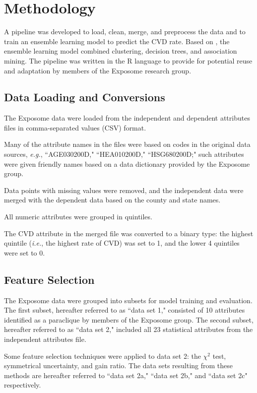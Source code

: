 \documentclass[conference,compsoc]{IEEEtran}
\begin{document}
\section{Methodology}

A pipeline was developed to load, clean, merge, and preprocess the data and to train an ensemble learning model to predict the
CVD rate. Based on \cite{datta}, the ensemble learning model combined clustering, decision trees, and association mining. The pipeline was written
in the R language to provide for potential reuse and adaptation by members of the Exposome research group.

\subsection{Data Loading and Conversions}

The Exposome data were loaded from the independent and dependent attributes files in comma-separated values (CSV) format.

Many of the attribute names in the files were based on codes in the original data sources, \textit{e.g.}, ``AGE030200D," ``HEA010200D," ``HSG680200D;"
such attributes were given friendly names based on a data dictionary provided by the Exposome group.

Data points with missing values were removed, and the independent data were merged with the dependent data based on the county and state names.

All numeric attributes were grouped in quintiles.

The CVD attribute in the merged file was converted to a binary type: the highest quintile (\textit{i.e.}, the highest rate of CVD) was set to 1,
and the lower 4 quintiles were set to 0.

\subsection{Feature Selection}

The Exposome data were grouped into subsets for model training and evaluation. The first subset, hereafter referred to as ``data set 1,"
consisted of 10 attributes identified as a paraclique by members of the Exposome group. The second subset, hereafter referred to as ``data set 2,"
included all 23 statistical attributes from the independent attributes file.

Some feature selection techniques were applied to data set 2: the ${\chi}^2$ test, symmetrical uncertainty, and gain ratio. The data sets resulting
from these methods are hereafter referred to ``data set 2a," ``data set 2b," and ``data set 2c" respectively.
\end{document}
